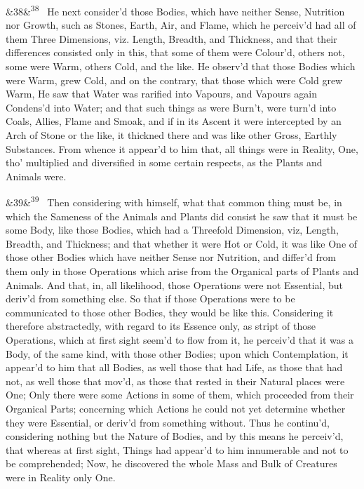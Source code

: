 \documentclass[12pt]{article}
\newcommand{\para}[1][]{\par\noindent\ifx&#1&\else\textsuperscript{\footnotesize #1}~\fi}
\begin{document}
\para[38] He next consider'd those Bodies, which have neither Sense, Nutrition nor Growth, such as Stones, Earth, Air, and Flame, which he perceiv'd had all of them Three Dimensions, viz. Length, Breadth, and Thickness, and that their differences consisted only in this, that some of them were Colour'd, others not, some were Warm, others Cold, and the like. He observ'd that those Bodies which were Warm, grew Cold, and on the contrary, that those which were Cold grew Warm, He saw that Water was rarified into Vapours, and Vapours again Condens'd into Water; and that such things as were Burn't, were turn'd into Coals, Allies, Flame and Smoak, and if in its Ascent it were intercepted by an Arch of Stone or the like, it thickned there and was like other Gross, Earthly Substances. From whence it appear'd to him that, all things were in Reality, One, tho' multiplied and diversified in some certain respects, as the Plants and Animals were.

\para[39] Then considering with himself, what that common thing must be, in which the Sameness of the Animals and Plants did consist he saw that it must be some Body, like those Bodies, which had a Threefold Dimension, viz, Length, Breadth, and Thickness; and that whether it were Hot or Cold, it was like One of those other Bodies which have neither Sense nor Nutrition, and differ'd from them only in those Operations which arise from the Organical parts of Plants and Animals. And that, in, all likelihood, those Operations were not Essential, but deriv'd from something else. So that if those Operations were to be communicated to those other Bodies, they would be like this. Considering it therefore abstractedly, with regard to its Essence only, as stript of those Operations, which at first sight seem'd to flow from it, he perceiv'd that it was a Body, of the same kind, with those other Bodies; upon which Contemplation, it appear'd to him that all Bodies, as well those that had Life, as those that had not, as well those that mov'd, as those that rested in their Natural places were One; Only there were some Actions in some of them, which proceeded from their Organical Parts; concerning which Actions he could not yet determine whether they were Essential, or deriv'd from something without. Thus he continu'd, considering nothing but the Nature of Bodies, and by this means he perceiv'd, that whereas at first sight, Things had appear'd to him innumerable and not to be comprehended; Now, he discovered the whole Mass and Bulk of Creatures were in Reality only One.
\end{document}
